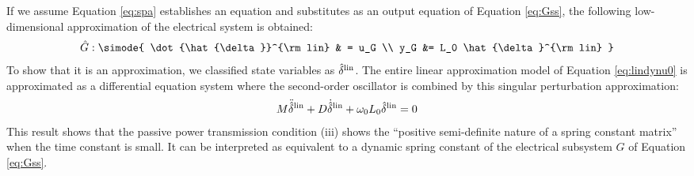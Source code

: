 \documentclass[graybox, envcountchap]{svmult}
\begin{document}
If we assume Equation \ref{eq:spa} establishes an equation and substitutes as an output equation of Equation \ref{eq:Gss}, the following low-dimensional approximation of the electrical system is obtained:
\begin{align}\label{eq:Gsssp}
\hat{G}: \simode{
\dot{\hat{\delta}}^{\rm lin} & = u_G \\
y_G &= L_0 \hat{\delta}^{\rm lin}
}
\end{align}
To show that it is an approximation, we classified state variables as $\hat{\delta}^{\rm lin}$.
The entire linear approximation model of Equation \ref{eq:lindynu0} is approximated as a differential equation system where the second-order oscillator is combined by this singular perturbation approximation:
\begin{align}\label{eq:spamodel}
M \ddot{\hat{\delta}}^{\rm lin}
+ D \dot{\hat{\delta}}^{\rm lin}
+\omega_0 L_0 \hat{\delta}^{\rm lin}=0
\end{align}
This result shows that the passive power transmission condition (iii) shows the “positive semi-definite nature of a spring constant matrix” when the time constant is small.
It can be interpreted as equivalent to a dynamic spring constant of the electrical subsystem $G$ of Equation \ref{eq:Gss}.
\end{document}
